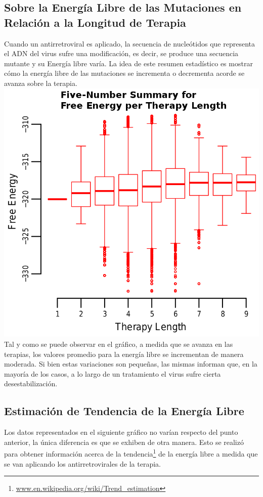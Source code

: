 \subsection{Sobre la Energ\'ia Libre de las Mutaciones en Relaci\'on a la Longitud de Terapia}
  Cuando un antirretroviral es aplicado, la secuencia de nucle\'otidos que representa el ADN del virus sufre una modificaci\'on, es decir, se produce una
  secuencia mutante y su Energ\'ia libre var\'ia. La idea de este resumen estad\'istico es mostrar c\'omo la energ\'ia libre de las mutaciones se
  incrementa o decrementa acorde se avanza sobre la terapia.\\
  \includegraphics[width=\linewidth]{images/free_energy_by_thrapy_length.png}\\
  Tal y como se puede observar en el gr\'afico, a medida que se avanza en las terapias, los valores promedio para la energ\'ia libre se incrementan
  de manera moderada. Si bien estas variaciones son peque\~nas, las mismas informan que, en la mayor\'ia de los casos, a lo largo de un tratamiento
  el virus sufre cierta desestabilizaci\'on.

\subsection{Estimaci\'on de Tendencia de la Energ\'ia Libre}
  Los datos representados en el siguiente gr\'afico no var\'ian respecto del punto anterior, la \'unica diferencia es que se exhiben de otra manera.
  Esto se realiz\'o para obtener informaci\'on acerca de la tendencia\footnote{\url{www.en.wikipedia.org/wiki/Trend\_estimation}} de la energ\'ia libre a medida 
  que se van aplicando los antirretrovirales de la terapia.\\

